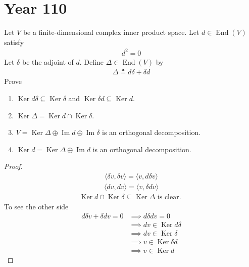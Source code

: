 \documentclass{report}
\begin{document}
\section{Year 110}
\begin{question}{}{}
Let $V$ be a finite-dimensional complex inner product space. Let $d\in \operatorname{End}(V)$ satisfy 
\begin{align*}
d^2=0
\end{align*}
Let $\delta$ be the adjoint of $d$. Define $\Delta \in \operatorname{End}(V)$ by 
\begin{align*}
\Delta \triangleq d\delta + \delta d
\end{align*}
Prove 
\begin{enumerate}[label=(\alph*)]
  \item $\operatorname{Ker}d\delta\subseteq \operatorname{Ker}\delta$ and $\operatorname{Ker}\delta d\subseteq \operatorname{Ker}d$.
  \item  $\operatorname{Ker}\Delta = \operatorname{Ker}d\cap \operatorname{Ker}\delta$. 
  \item $V= \operatorname{Ker}\Delta \oplus  \operatorname{Im}d \oplus  \operatorname{Im}\delta$ is an orthogonal decomposition. 
  \item $\operatorname{Ker}d=\operatorname{Ker}\Delta \oplus  \operatorname{Im}d$ is an orthogonal decomposition. 
\end{enumerate}
\end{question}
\begin{proof}
\begin{align*}
 \langle \delta v, \delta v\rangle = \langle v, d \delta v\rangle 
\end{align*}
\begin{align*}
\langle dv,dv\rangle = \langle v, \delta d v\rangle 
\end{align*}
\begin{align*}
\operatorname{Ker}d \cap  \operatorname{Ker}\delta \subseteq \operatorname{Ker}\Delta \text{ is clear. } 
\end{align*}
To see the other side
\begin{align*}
  d\delta v+ \delta dv =0 &\implies d\delta dv  =0 \\
  &\implies dv \in \operatorname{Ker}d \delta \\
  &\implies dv \in \operatorname{Ker}\delta \\
  &\implies v \in \operatorname{Ker}\delta d \\
  &\implies  v \in \operatorname{Ker}d  
\end{align*}




\end{proof}
\end{document}
